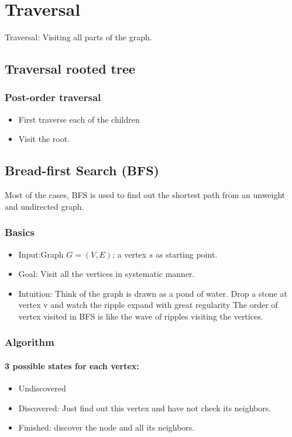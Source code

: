 \documentclass[en,hazy,blue,screen,14pt]{elegantnote}
\begin{document}
\section{Traversal}
Traversal: Visiting all parts of the graph.
\subsection{Traversal rooted tree}
\subsubsection{Post-order traversal}
\begin{itemize}
\item First traverse each of the children 
\item Visit the root.
\end{itemize}
\subsection{Bread-first Search (BFS)}
Most of the cases, BFS is used to find out the shortest path from an unweight 
and undirected graph.
\subsubsection{Basics}
\begin{itemize}
    \item Input:Graph $G = (V, E)$; a vertex $s$ as starting point.
    \item Goal: Visit all the vertices in systematic manner.
    \item Intuition: Think of the graph is drawn as a pond of water. Drop a 
stone at vertex v and watch the ripple expand with great regularity The 
order of vertex visited in BFS is like the wave of ripples visiting the 
vertices.
\end{itemize}

\subsubsection{Algorithm}

\paragraph{3 possible states for each vertex:}
\begin{itemize}
 \item Undiscovered
 \item Discovered: Just find out this vertex and have not check its neighbors.
 \item Finished: discover the node and all its neighbors.
\end{itemize}
\end{document}
